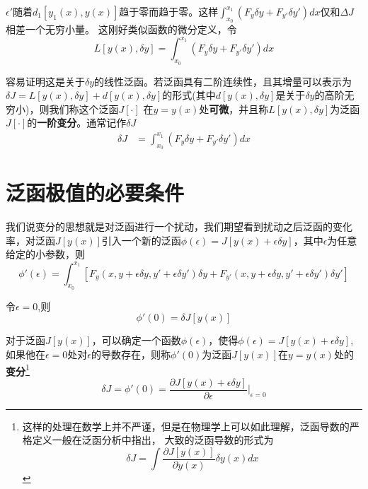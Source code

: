 $\epsilon'$随着$d_1[y_1(x),y(x)]$趋于零而趋于零。这样$ \int_{x_0}^{x_1} (F_y\delta y+F_{y'}\delta y')dx$仅和$\Delta J$相差一个无穷小量。
这刚好类似函数的微分定义，令
\begin{equation}
    L[y(x),\delta y]=\int_{x_0}^{x_1}(F_y\delta y+F_{y'}\delta y')dx
\end{equation}

容易证明这是关于$\delta y$的线性泛函。若泛函具有二阶连续性，且其增量可以表示为$\delta J=L[y(x),\delta y]+d[y(x),\delta y]$的形式(其中$d[y(x),\delta y]$是关于$\delta y$的高阶无穷小)，则我们称这个泛函$J[\cdot]$
在$y=y(x)$处\textbf{可微}，并且称$L[y(x),\delta y]$为泛函$J[\cdot]$的\textbf{一阶变分}。通常记作$\delta J$
\begin{equation}
    \begin{aligned}
         \delta J&=\int_{x_0}^{x_1}(F_y\delta y+F_{y'}\delta y')dx
    \end{aligned}
\end{equation}

\section{泛函极值的必要条件}

我们说变分的思想就是对泛函进行一个扰动，我们期望看到扰动之后泛函的变化率，对泛函$J[y(x)]$引入一个新的泛函$\phi(\epsilon)=J[y(x)+\epsilon\delta y]$，其中$\epsilon$为任意给定的小参数，则
\begin{equation}
    \phi'(\epsilon)=\int_{x_0}^{x_1} \left[F_y(x,y+\epsilon\delta y,y'+\epsilon\delta y')\delta y+F_{y'}(x,y+\epsilon\delta y,y'+\epsilon\delta y')\delta y'\right]
\end{equation}

令$\epsilon=0$,则
\begin{equation}
    \phi'(0)=\delta J[y(x)]
\end{equation}

对于泛函$J[y(x)]$，可以确定一个函数$\phi(\epsilon)$，使得$\phi(\epsilon)=J[y(x)+\epsilon\delta y]$,如果他在$\epsilon=0$处对$\epsilon$的导数存在，则称$\phi'(0)$为泛函$J[y(x)]$在$y=y(x)$处的\textbf{变分}\footnote{这样的处理在数学上并不严谨，但是在物理学上可以如此理解，泛函导数的严格定义一般在泛函分析中指出，
大致的泛函导数的形式为
    \begin{equation}
        \delta J=\int \frac{\partial J[y(x)]}{\partial y(x)}\delta y(x)dx
    \end{equation}
}
\begin{equation}
    \delta J=\phi'(0)=\frac{\partial J[y(x)+\epsilon\delta y]}{\partial \epsilon}\vert_{\epsilon=0}
\end{equation}


